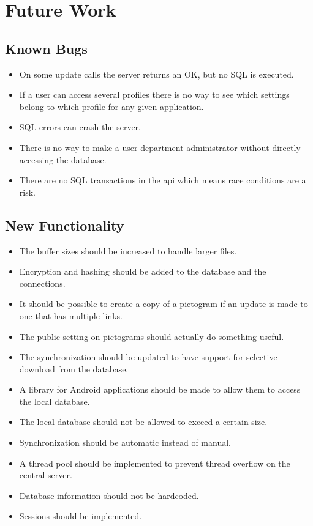 \section{Future Work}

\subsection{Known Bugs}
\begin{itemize}
\item On some update calls the server returns an OK, but no SQL is executed.
\item If a user can access several profiles there is no way to see which settings belong to which profile for any given application.
\item SQL errors can crash the server.
\item There is no way to make a user department administrator without directly accessing the database.
\item There are no SQL transactions in the \ac{api} which means race conditions are a risk. 
\end{itemize}

\subsection{New Functionality}
\begin{itemize}
\item The buffer sizes should be increased to handle larger files.
\item Encryption and hashing should be added to the database and the connections.
\item It should be possible to create a copy of a pictogram if an update is made to one that has multiple links.
\item The public setting on pictograms should actually do something useful.
\item The synchronization should be updated to have support for selective download from the database.
\item A library for Android applications should be made to allow them to access the local database.
\item The local database should not be allowed to exceed a certain size.
\item Synchronization should be automatic instead of manual.
\item A thread pool should be implemented to prevent thread overflow on the central server.
\item Database information should not be hardcoded.
\item Sessions should be implemented.
\end{itemize}